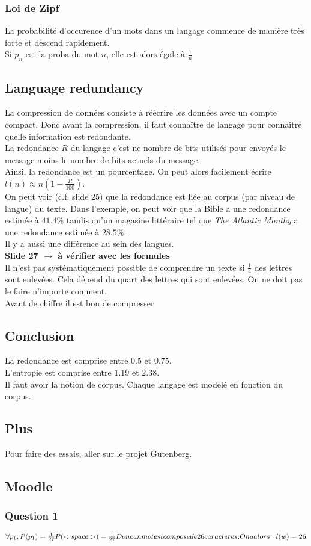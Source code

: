 \subsubsection{Loi de Zipf}
La probabilité d'occurence d'un mots dans un langage commence de manière très forte et descend rapidement.\\
Si $p_n$ est la proba du mot $n$, elle est alors égale à $\frac{1}{n}$
\subsection{Language redundancy}
La compression de données consiste à réécrire les données avec un compte compact. Donc avant la compression, il faut connaître de langage pour connaître quelle information est redondante.\\
La redondance $R$ du langage c'est ne nombre de bits utilisés pour envoyés le message moins le nombre de bits actuels du message.\\
Ainsi, la redondance est un pourcentage. On peut alors facilement écrire $l(n)\approx n(1-\frac{R}{100})$.\\
On peut voir (c.f. slide 25) que la redondance est liée au corpus (par niveau de langue) du texte. Dans l'exemple, on peut voir que la Bible a une redondance estimée à $41.4\%$ tandis qu'un magasine littéraire tel que \textit{The Atlantic Monthy} a une redondance estimée à $28.5\%$.\\
Il y a aussi une différence au sein des langues.\\
\textbf{Slide 27 $\rightarrow$ à vérifier avec les formules}\\
Il n'est pas systématiquement possible de comprendre un texte si $\frac{1}{4}$ des lettres sont enlevées. Cela dépend du quart des lettres qui sont enlevées. On ne doit pas le faire n'importe comment.\\
Avant de chiffre il est bon de compresser\\
\subsection{Conclusion}
La redondance est comprise entre $0.5$ et $0.75$.\\
L'entropie est comprise entre $1.19$ et $2.38$.\\
Il faut avoir la notion de corpus. Chaque langage est modelé en fonction du corpus.\\
\subsection{Plus}
Pour faire des essais, aller sur le projet Gutenberg.
\subsection{Moodle}
\subsubsection{Question 1}
\begin{math}
\forall p_1; P(p_1)=\frac{1}{27}\\
P(<space>)=\frac{1}{27}\\
Donc un mot est compose de 26 caracteres. On a alors :\\
l(w)=26
\end{math}
